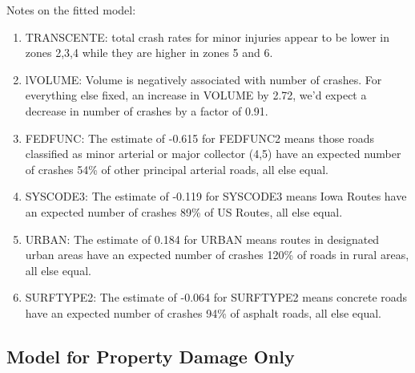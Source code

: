 \documentclass[a4paper]{article}\usepackage[]{graphicx}\usepackage[]{color}
\begin{document}
Notes on the fitted model:

\begin{enumerate}
\item
TRANSCENTE: total crash rates for minor injuries appear to be lower in zones 2,3,4 while they are higher in zones 5 and 6. 

\item
lVOLUME: Volume is negatively associated with number of crashes. For everything else fixed, an increase in VOLUME by 2.72, we'd expect a decrease in number of crashes by a factor of 0.91.

\item
FEDFUNC: The estimate of -0.615 for FEDFUNC2 means those roads classified as minor arterial or major collector (4,5) have an expected number of crashes 54\% of other principal arterial roads, all else equal. 

\item
SYSCODE3: The estimate of -0.119 for SYSCODE3 means Iowa Routes have an expected number of crashes 89\% of US Routes, all else equal.

\item
URBAN: The estimate of 0.184 for URBAN means routes in designated urban areas have an expected number of crashes 120\% of roads in rural areas, all else equal.

\item
SURFTYPE2: The estimate of -0.064 for SURFTYPE2 means concrete roads have an expected number of crashes 94\% of asphalt roads, all else equal.

\end{enumerate}


\clearpage
\subsection{Model for Property Damage Only}
\end{document}
